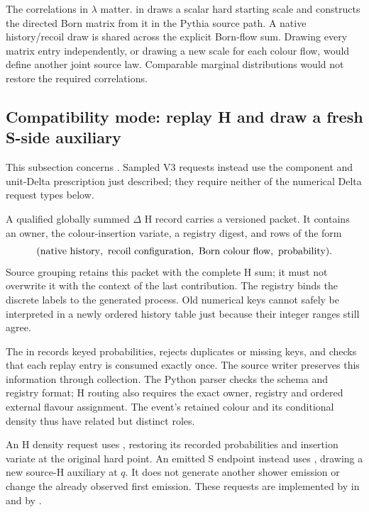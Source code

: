 The correlations in $\lambda$ matter.
 in
draws a scalar hard starting scale and constructs the directed Born
matrix from it in the Pythia source path.
A native history/recoil draw is shared across the explicit Born-flow
sum. Drawing every matrix entry independently, or drawing a new scale
for each colour flow, would define another joint source law.
Comparable marginal distributions would not restore the required
correlations.

\subsection{Compatibility mode: replay H and draw a fresh S-side auxiliary}
\label{sec:delta-replay}

This subsection concerns . Sampled V3 requests
instead use the component and unit-Delta prescription just described;
they require neither of the numerical Delta request types below.

A qualified globally summed $\Delta$ H record carries a versioned
 packet.
It contains an owner, the colour-insertion variate, a registry digest,
and rows of the form
\begin{equation}
  (\hbox{native history},\ \hbox{recoil configuration},\
             \hbox{Born colour flow},\ \hbox{probability}).
 \label{eq:delta-replay-key}
\end{equation}
Source grouping retains this packet with the complete H sum;
it must not overwrite it with the context of the last contribution.
The registry binds the discrete labels to the generated process.
Old numerical keys cannot safely be interpreted in a newly ordered
history table just because their integer ranges still agree.

The  in
records keyed probabilities, rejects duplicates or missing keys,
and checks that each replay entry is consumed exactly once.
The source writer preserves this information through collection.
The Python \code{DeltaContext} parser checks the schema and registry
format; H routing also requires the exact owner, registry and ordered
external flavour assignment.
The event's retained colour and its conditional density thus have
related but distinct roles.

An H density request uses , restoring its recorded
probabilities and insertion variate at the original hard point.
An emitted S endpoint instead uses , drawing a
new source-H auxiliary at $q$.
It does not generate another shower emission or change the already
observed first emission.
These requests are implemented by
 in
 and by
.

